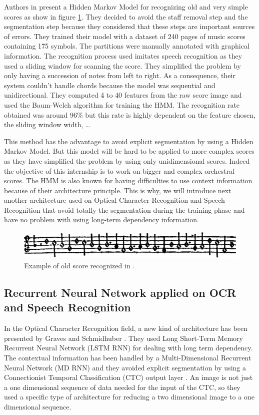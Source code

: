 \documentclass[11pt]{sdm}
\begin{document}
Authors in \cite{pugin_optical_2006} present a Hidden Markov Model for recognizing old and very simple scores as show in figure \ref{old_score_HMM}.
They decided to avoid the staff removal step and the segmentation step because they considered that these steps are important sources of errors.
They trained their model with a dataset of 240 pages of music scores containing 175 symbols.
The partitions were manually annotated with graphical information.
The recognition process used imitates speech recognition as they used a sliding window for scanning the score.
They simplified the problem by only having a succession of notes from left to right.
As a consequence, their system couldn't handle chords because the model was sequential and unidirectional.
They computed 4 to 40 features from the raw score image and used the Baum-Welch algorithm for training the HMM.
The recognition rate obtained was around 96\% but this rate is highly dependent on the feature chosen, the sliding window width, \ldots

This method has the advantage to avoid explicit segmentation by using a Hidden Markov Model.
But this model will be hard to be applied to more complex scores as they have simplified the problem by using only unidimensional scores.
Indeed the objective of this internship is to work on bigger and complex orchestral scores.
The HMM is also known for having difficulties to use context information because of their architecture principle.
This is why, we will introduce next another architecture used on Optical Character Recognition and Speech Recognition that avoid totally the segmentation during the training phase and have no problem with using long-term dependency information.
\begin{figure}[btp]
  \includegraphics[scale=0.16]{img/old_score_HMM}
  \caption{\label{old_score_HMM} Example of old score recognized in \cite{pugin_optical_2006}. }
\end{figure}

\subsection{Recurrent Neural Network applied on OCR and Speech Recognition}

In the Optical Character Recognition field, a new kind of architecture has been presented by Graves and Schmidhuber \cite{graves_offline_2009}.
They used Long Short-Term Memory Recurrent Neural Network (LSTM RNN) \cite{hochreiter_long_1997} for dealing with long term dependency.
The contextual information has been handled by a Multi-Dimensional Recurrent Neural Network (MD RNN) and they avoided explicit segmentation by using a Connectionist Temporal Classification (CTC) output layer \cite{graves_connectionist_2006}.
An image is not just a one dimensional sequence of data needed for the input of the CTC, so they used a specific type of architecture for reducing a two dimensional image to a one dimensional sequence.
\end{document}
